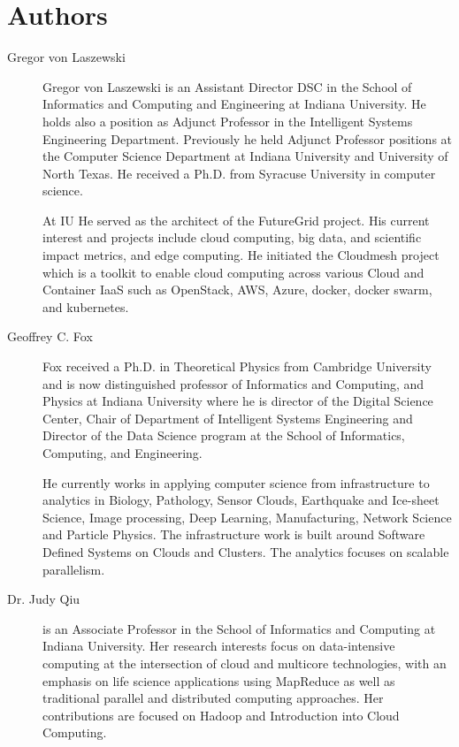 \section{Authors}

\FILENAME

\begin{description}

\item[Gregor von Laszewski]  Gregor von
  Laszewski is an Assistant Director DSC in the School of Informatics
  and Computing and Engineering at Indiana University. He holds also a
  position as Adjunct Professor in the Intelligent Systems Engineering
  Department. Previously he held Adjunct Professor positions at the
  Computer Science Department at Indiana University and University of
  North Texas. He received a Ph.D. from Syracuse University in
  computer science.

  At IU He served as the architect of the FutureGrid project. His
  current interest and projects include cloud computing, big data, and
  scientific impact metrics, and edge computing.  He initiated the
  Cloudmesh project which is a toolkit to enable cloud computing
  across various Cloud and Container IaaS such as OpenStack, AWS,
  Azure, docker, docker swarm, and kubernetes.


\item[Geoffrey C. Fox]  Fox received a Ph.D. in
  Theoretical Physics from Cambridge University and is now
  distinguished professor of Informatics and Computing, and Physics at
  Indiana University where he is director of the Digital Science
  Center, Chair of Department of Intelligent Systems Engineering and
  Director of the Data Science program at the School of Informatics,
  Computing, and Engineering.

  He currently works in applying computer science from infrastructure
  to analytics in Biology, Pathology, Sensor Clouds, Earthquake and
  Ice-sheet Science, Image processing, Deep Learning, Manufacturing,
  Network Science and Particle Physics. The infrastructure work is
  built around Software Defined Systems on Clouds and Clusters. The
  analytics focuses on scalable parallelism.

\item [Dr. Judy Qiu] is an Associate Professor in the School of
  Informatics and Computing at Indiana University. Her research
  interests focus on data-intensive computing at the intersection of
  cloud and multicore technologies, with an emphasis on life science
  applications using MapReduce as well as traditional parallel and
  distributed computing approaches. Her contributions are focused on
  Hadoop and Introduction into Cloud Computing. 

\end{description}

